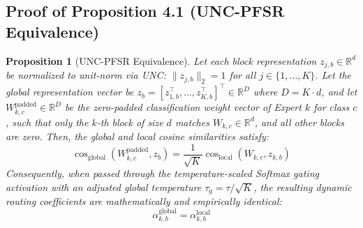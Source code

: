 \documentclass{article}
\theoremstyle{plain}
\newtheorem{proposition}[theorem]{Proposition}
\theoremstyle{definition}
\theoremstyle{remark}
\begin{document}
\subsection{Proof of Proposition 4.1 (UNC-PFSR Equivalence)}
\begin{proposition}[UNC-PFSR Equivalence]
Let each block representation $z_{j, b} \in \mathbb{R}^d$ be normalized to unit-norm via UNC: $\|z_{j, b}\|_2 = 1$ for all $j \in \{1, \dots, K\}$. Let the global representation vector be $z_b = [z_{1, b}^\top, \dots, z_{K, b}^\top]^\top \in \mathbb{R}^D$ where $D = K \cdot d$, and let $W_{k, c}^{\text{padded}} \in \mathbb{R}^D$ be the zero-padded classification weight vector of Expert $k$ for class $c$, such that only the $k$-th block of size $d$ matches $W_{k, c} \in \mathbb{R}^d$, and all other blocks are zero. Then, the global and local cosine similarities satisfy:
\begin{equation}
\cos_{\text{global}}(W_{k, c}^{\text{padded}}, z_b) = \frac{1}{\sqrt{K}} \cos_{\text{local}}(W_{k, c}, z_{k, b})
\end{equation}
Consequently, when passed through the temperature-scaled Softmax gating activation with an adjusted global temperature $\tau_g = \tau / \sqrt{K}$, the resulting dynamic routing coefficients are mathematically and empirically identical:
\begin{equation}
\alpha^{\text{global}}_{k, b} = \alpha^{\text{local}}_{k, b}
\end{equation}
\end{proposition}
\end{document}

